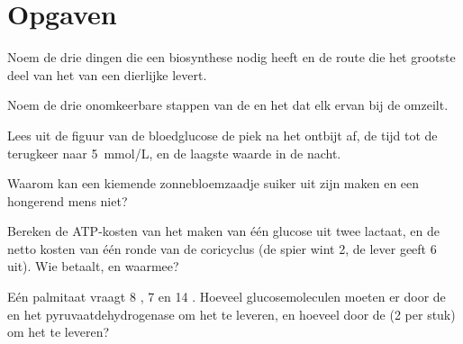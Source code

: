 \section{Opgaven}

\begin{exercise}[$\star$]\label{exo:b1:biosyntheses-integration:1}
Noem de drie dingen die een biosynthese nodig heeft en de route die het grootste
deel van het  van een dierlijke  levert.
\end{exercise}

\begin{exercise}[$\star$]\label{exo:b1:biosyntheses-integration:2}
Noem de drie onomkeerbare stappen van de  en het  dat elk ervan bij
de  omzeilt.
\end{exercise}

\begin{exercise}[$\star$]\label{exo:b1:biosyntheses-integration:3}
Lees uit de figuur van de bloedglucose de piek na het ontbijt af, de tijd tot de
terugkeer naar \qty{5}{mmol/L}, en de laagste waarde in de nacht.
\end{exercise}

\begin{exercise}[$\star$]\label{exo:b1:biosyntheses-integration:4}
Waarom kan een kiemende zonnebloemzaadje suiker uit zijn  maken en een
hongerend mens niet?
\end{exercise}

\begin{exercise}[$\star\star$]\label{exo:b1:biosyntheses-integration:5}
Bereken de ATP-kosten van het maken van één glucose uit twee lactaat, en de netto
kosten van één ronde van de coricyclus (de spier wint 2, de lever geeft 6 uit). Wie
betaalt, en waarmee?
\end{exercise}

\begin{exercise}[$\star\star$]\label{exo:b1:biosyntheses-integration:6}
Eén palmitaat vraagt 8 , 7  en 14 . Hoeveel glucosemoleculen
moeten er door de  en het pyruvaatdehydrogenase om het  te
leveren, en hoeveel door de  (2  per stuk) om het  te
leveren?
\end{exercise}

